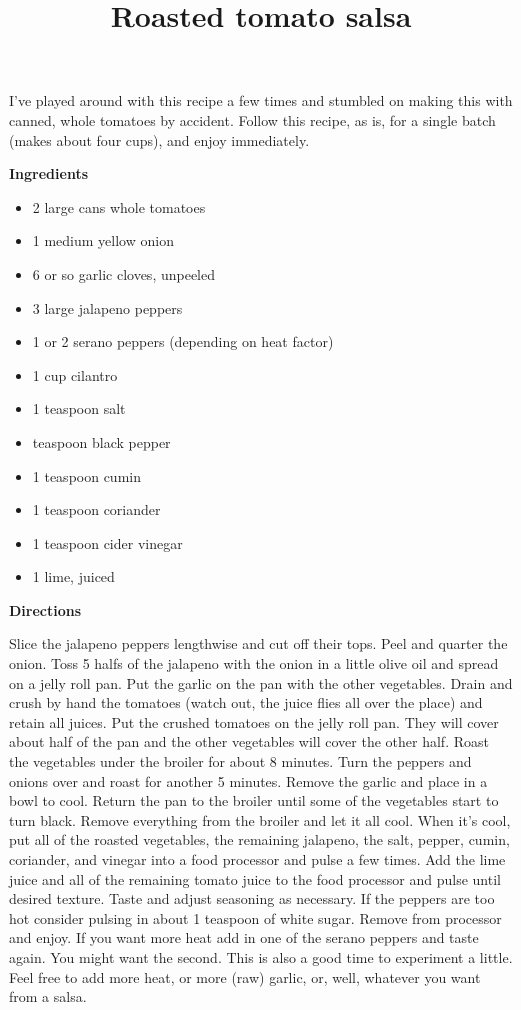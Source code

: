 \documentclass{article}
\title{Roasted tomato salsa}
\begin{document}
I've played around with this recipe a few times and stumbled on making this
with canned, whole tomatoes by accident. Follow this recipe, as is, for a
single batch (makes about four cups), and enjoy immediately.

\bigskip

\bigskip

\textbf{Ingredients}

\begin{itemize}
      \item 2 large cans whole tomatoes
      \item 1 medium yellow onion
      \item 6 or so garlic cloves, unpeeled
      \item 3 large jalapeno peppers
      \item 1 or 2 serano peppers (depending on heat factor)
      \item 1 cup cilantro
      \item 1 teaspoon salt
      \item {} teaspoon black pepper
      \item 1 teaspoon cumin
      \item 1 teaspoon coriander
      \item 1 teaspoon cider vinegar
      \item 1 lime, juiced
\end{itemize}

\bigskip

\textbf{Directions}

Slice the jalapeno peppers lengthwise and cut off their tops. Peel and
quarter the onion. Toss 5 halfs of the jalapeno with the onion in a
little olive oil and spread on a jelly roll pan. Put the garlic on the
pan with the other vegetables.
\medskip
Drain and crush by hand the tomatoes (watch out, the juice flies all
over the place) and retain all juices. Put the crushed tomatoes on the
jelly roll pan. They will cover about half of the pan and the other
vegetables will cover the other half.
\medskip
Roast the vegetables under the broiler for about 8 minutes. Turn the
peppers and onions over and roast for another 5 minutes. Remove the
garlic and place in a bowl to cool. Return the pan to the broiler until
some of the vegetables start to turn black.
\medskip
Remove everything from the broiler and let it all cool. When it's cool,
put all of the roasted vegetables, the remaining  jalapeno, the salt,
pepper, cumin, coriander, and vinegar into a food processor and pulse a
few times. Add the lime juice and all of the remaining tomato juice to the
food processor and pulse until desired texture.
\medskip
Taste and adjust seasoning as necessary. If the peppers are too hot
consider pulsing in about 1 teaspoon of white sugar. Remove from processor
and enjoy. If you want more heat add in one of the serano peppers and taste
again. You might want the second.
\medskip
This is also a good time to experiment a little. Feel free to add more heat,
or more (raw) garlic, or, well, whatever you want from a salsa.
\medskip
\end{document}
